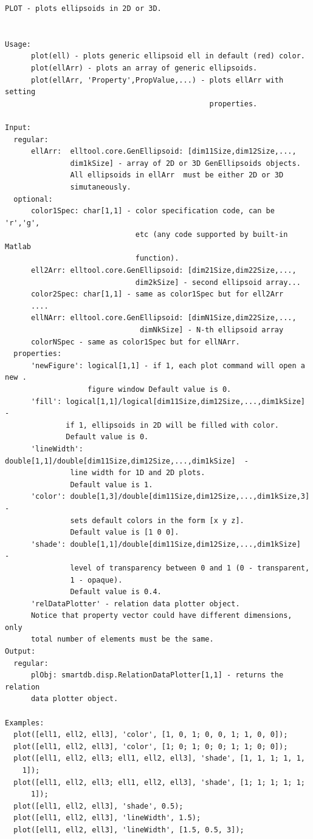 \documentclass[letterpaper,10pt,english]{sphinxmanual}
\begin{document}
\begin{Verbatim}[commandchars=\\\{\}]
PLOT - plots ellipsoids in 2D or 3D.


Usage:
      plot(ell) - plots generic ellipsoid ell in default (red) color.
      plot(ellArr) - plots an array of generic ellipsoids.
      plot(ellArr, 'Property',PropValue,...) - plots ellArr with setting
                                               properties.

Input:
  regular:
      ellArr:  elltool.core.GenEllipsoid: [dim11Size,dim12Size,...,
               dim1kSize] - array of 2D or 3D GenEllipsoids objects.
               All ellipsoids in ellArr  must be either 2D or 3D
               simutaneously.
  optional:
      color1Spec: char[1,1] - color specification code, can be 'r','g',
                              etc (any code supported by built-in Matlab
                              function).
      ell2Arr: elltool.core.GenEllipsoid: [dim21Size,dim22Size,...,
                              dim2kSize] - second ellipsoid array...
      color2Spec: char[1,1] - same as color1Spec but for ell2Arr
      ....
      ellNArr: elltool.core.GenEllipsoid: [dimN1Size,dim22Size,...,
                               dimNkSize] - N-th ellipsoid array
      colorNSpec - same as color1Spec but for ellNArr.
  properties:
      'newFigure': logical[1,1] - if 1, each plot command will open a new .
                   figure window Default value is 0.
      'fill': logical[1,1]/logical[dim11Size,dim12Size,...,dim1kSize]  -
              if 1, ellipsoids in 2D will be filled with color.
              Default value is 0.
      'lineWidth': double[1,1]/double[dim11Size,dim12Size,...,dim1kSize]  -
               line width for 1D and 2D plots.
               Default value is 1.
      'color': double[1,3]/double[dim11Size,dim12Size,...,dim1kSize,3] -
               sets default colors in the form [x y z].
               Default value is [1 0 0].
      'shade': double[1,1]/double[dim11Size,dim12Size,...,dim1kSize]  -
               level of transparency between 0 and 1 (0 - transparent,
               1 - opaque).
               Default value is 0.4.
      'relDataPlotter' - relation data plotter object.
      Notice that property vector could have different dimensions, only
      total number of elements must be the same.
Output:
  regular:
      plObj: smartdb.disp.RelationDataPlotter[1,1] - returns the relation
      data plotter object.

Examples:
  plot([ell1, ell2, ell3], 'color', [1, 0, 1; 0, 0, 1; 1, 0, 0]);
  plot([ell1, ell2, ell3], 'color', [1; 0; 1; 0; 0; 1; 1; 0; 0]);
  plot([ell1, ell2, ell3; ell1, ell2, ell3], 'shade', [1, 1, 1; 1, 1,
    1]);
  plot([ell1, ell2, ell3; ell1, ell2, ell3], 'shade', [1; 1; 1; 1; 1;
      1]);
  plot([ell1, ell2, ell3], 'shade', 0.5);
  plot([ell1, ell2, ell3], 'lineWidth', 1.5);
  plot([ell1, ell2, ell3], 'lineWidth', [1.5, 0.5, 3]);
\end{Verbatim}
\end{document}
